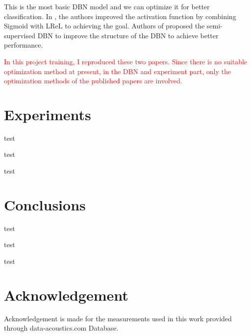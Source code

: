 \documentclass{modified}
\begin{document}
This is the most basic DBN model and we can optimize it for better classification. In \cite{YiThe}, the authors improved the activation function by combining Sigmoid with LReL to achieving the goal. Authors of \cite{wang2017improved} proposed the semi-supervised DBN to improve the structure of the DBN to achieve better performance.

\textcolor{red}{In this project training, I reproduced these two papers. Since there is no suitable optimization method at present, in the DBN and experiment part, only the optimization methods of the published papers are involved.}
\section{Experiments}
test

test

test
\section{Conclusions}
test

test

test
\section*{Acknowledgement}
Acknowledgement is made for the measurements used in this work provided through data-acoustics.com Database.





 
\end{document}
